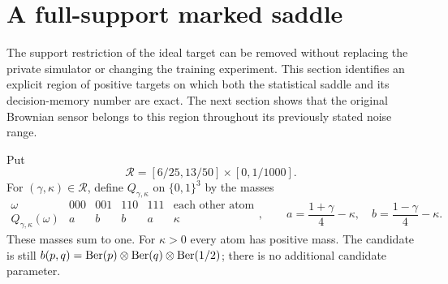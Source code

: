 \section{A full-support marked saddle}
\label{sec:positive-saddle}
The support restriction of the ideal target can be removed without
replacing the private simulator or changing the training experiment.
This section identifies an explicit region of positive targets on which
both the statistical saddle and its decision-memory number are exact.
The next section shows that the original Brownian sensor belongs to this
region throughout its previously stated noise range.

Put
\[
 \mathcal R=[6/25,13/50]\times[0,1/1000].
\]
For $(\gamma,\kappa)\in\mathcal R$, define $Q_{\gamma,\kappa}$ on
$\{0,1\}^3$ by the masses
\begin{equation}\label{eq:leak-target}
 \begin{array}{c|cccc|c}
 \omega&000&001&110&111&\text{each other atom}\\\hline
 Q_{\gamma,\kappa}(\omega)&a&b&b&a&\kappa
 \end{array},\qquad
 a=\frac{1+\gamma}{4}-\kappa,\quad
 b=\frac{1-\gamma}{4}-\kappa.
\end{equation}
These masses sum to one. For $\kappa>0$ every atom has positive mass.
The candidate is still $b(p,q)=\operatorname{Ber}(p)\otimes\operatorname{Ber}(q)\otimes\operatorname{Ber}(1/2)$;
there is no additional candidate parameter.

